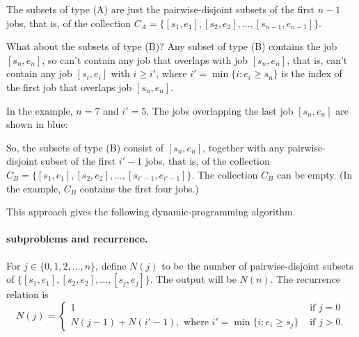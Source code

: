The subsets of type (A) are just the pairwise-disjoint
subsets of the first $n-1$ jobs,
that is, of the collection $C_A=\{[s_1, e_1], [s_2, e_2], \ldots, [s_{n-1}, e_{n-1}]\}$.


What about the subsets of type (B)?
Any subset of type (B) contains the job $[s_n, e_n]$,
so can't contain any job that overlaps with job $[s_n, e_n]$,
that is, can't contain any job $[s_i, e_i]$ with $i \ge i'$,
where $i' = \min\{ i: e_i \ge s_n\}$
is the index of the first job that overlaps job $[s_n, e_n]$.

In the example, $n=7$ and $i'=5$.
The jobs overlapping the last job $[s_n, e_n]$ are shown in blue:

\begin{center}
\end{center}

So, the subsets of type (B) consist of $[s_n, e_n]$,
together with any pairwise-disjoint subset of the first $i'-1$ jobs,
that is, of the collection $C_B=\{[s_1, e_1], [s_2, e_2], \ldots, [s_{i'-1}, e_{i'-1}]\}$.
The collection $C_B$ can be empty.
(In the example, $C_B$ contains the first four jobs.)

This approach gives the following dynamic-programming algorithm.

\paragraph{subproblems and recurrence.}
For $j\in\{0,1,2,\ldots, n\}$,
define $N(j)$ to be the number of pairwise-disjoint subsets of 
$\{[s_1, e_1], [s_2, e_2], \ldots, [s_j, e_j]\}$.
The output will be $N(n)$.
The recurrence relation is
\[
  N(j) = \begin{cases}
    1 & \text{ if } j=0 \\
    N(j-1) + N(i'-1), \text{ where }  i' = \min\{ i : e_i \ge s_j \}
    & \text{ if } j>0.
  \end{cases} 
\]

